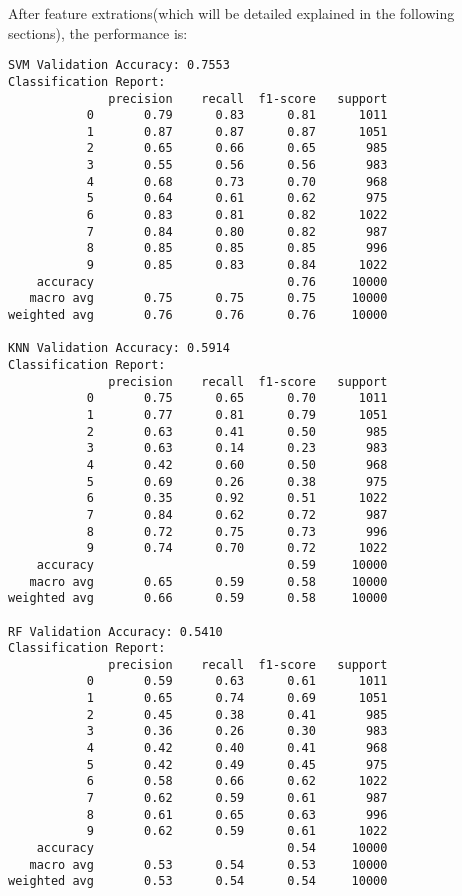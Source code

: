 \documentclass[a4paper,11pt]{article}
\begin{document}
After feature extrations(which will be detailed explained in the following sections), the performance is:
\begin{verbatim}
SVM Validation Accuracy: 0.7553
Classification Report:
              precision    recall  f1-score   support
           0       0.79      0.83      0.81      1011
           1       0.87      0.87      0.87      1051
           2       0.65      0.66      0.65       985
           3       0.55      0.56      0.56       983
           4       0.68      0.73      0.70       968
           5       0.64      0.61      0.62       975
           6       0.83      0.81      0.82      1022
           7       0.84      0.80      0.82       987
           8       0.85      0.85      0.85       996
           9       0.85      0.83      0.84      1022
    accuracy                           0.76     10000
   macro avg       0.75      0.75      0.75     10000
weighted avg       0.76      0.76      0.76     10000

KNN Validation Accuracy: 0.5914
Classification Report:
              precision    recall  f1-score   support
           0       0.75      0.65      0.70      1011
           1       0.77      0.81      0.79      1051
           2       0.63      0.41      0.50       985
           3       0.63      0.14      0.23       983
           4       0.42      0.60      0.50       968
           5       0.69      0.26      0.38       975
           6       0.35      0.92      0.51      1022
           7       0.84      0.62      0.72       987
           8       0.72      0.75      0.73       996
           9       0.74      0.70      0.72      1022
    accuracy                           0.59     10000
   macro avg       0.65      0.59      0.58     10000
weighted avg       0.66      0.59      0.58     10000

RF Validation Accuracy: 0.5410
Classification Report:
              precision    recall  f1-score   support
           0       0.59      0.63      0.61      1011
           1       0.65      0.74      0.69      1051
           2       0.45      0.38      0.41       985
           3       0.36      0.26      0.30       983
           4       0.42      0.40      0.41       968
           5       0.42      0.49      0.45       975
           6       0.58      0.66      0.62      1022
           7       0.62      0.59      0.61       987
           8       0.61      0.65      0.63       996
           9       0.62      0.59      0.61      1022
    accuracy                           0.54     10000
   macro avg       0.53      0.54      0.53     10000
weighted avg       0.53      0.54      0.54     10000

\end{verbatim}
\end{document}
